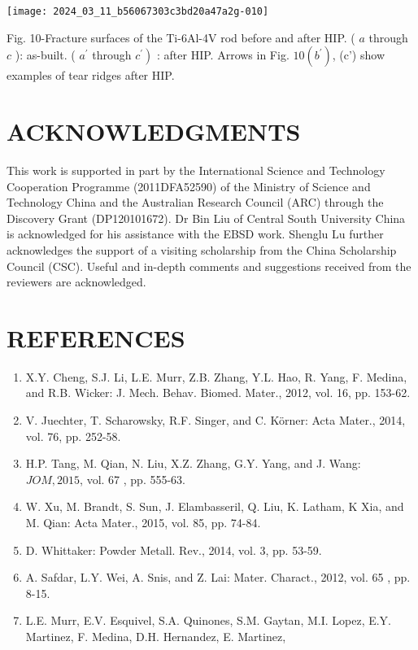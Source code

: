 \documentclass[10pt]{article}
\begin{document}
\begin{center}
\texttt{[image: 2024\_03\_11\_b56067303c3bd20a47a2g-010]}
\end{center}

Fig. 10-Fracture surfaces of the Ti-6Al-4V rod before and after HIP. ( $a$ through $c$ ): as-built. ( $a^{\prime}$ through $\left.c^{\prime}\right)$ : after HIP. Arrows in Fig. $10\left(b^{\prime}\right)$, (c') show examples of tear ridges after HIP.

\section*{ACKNOWLEDGMENTS}
This work is supported in part by the International Science and Technology Cooperation Programme (2011DFA52590) of the Ministry of Science and Technology China and the Australian Research Council (ARC) through the Discovery Grant (DP120101672). Dr Bin Liu of Central South University China is acknowledged for his assistance with the EBSD work. Shenglu $\mathrm{Lu}$ further acknowledges the support of a visiting scholarship from the China Scholarship Council (CSC). Useful and in-depth comments and suggestions received from the reviewers are acknowledged.

\section*{REFERENCES}
\begin{enumerate}
  \item X.Y. Cheng, S.J. Li, L.E. Murr, Z.B. Zhang, Y.L. Hao, R. Yang, F. Medina, and R.B. Wicker: J. Mech. Behav. Biomed. Mater., 2012, vol. 16, pp. 153-62.

  \item V. Juechter, T. Scharowsky, R.F. Singer, and C. Körner: Acta Mater., 2014, vol. 76, pp. 252-58.

  \item H.P. Tang, M. Qian, N. Liu, X.Z. Zhang, G.Y. Yang, and J. Wang: $J O M, 2015$, vol. 67 , pp. 555-63.

  \item W. Xu, M. Brandt, S. Sun, J. Elambasseril, Q. Liu, K. Latham, K Xia, and M. Qian: Acta Mater., 2015, vol. 85, pp. 74-84.

  \item D. Whittaker: Powder Metall. Rev., 2014, vol. 3, pp. 53-59.

  \item A. Safdar, L.Y. Wei, A. Snis, and Z. Lai: Mater. Charact., 2012, vol. 65 , pp. 8-15.

  \item L.E. Murr, E.V. Esquivel, S.A. Quinones, S.M. Gaytan, M.I. Lopez, E.Y. Martinez, F. Medina, D.H. Hernandez, E. Martinez,

\end{enumerate}
\end{document}
